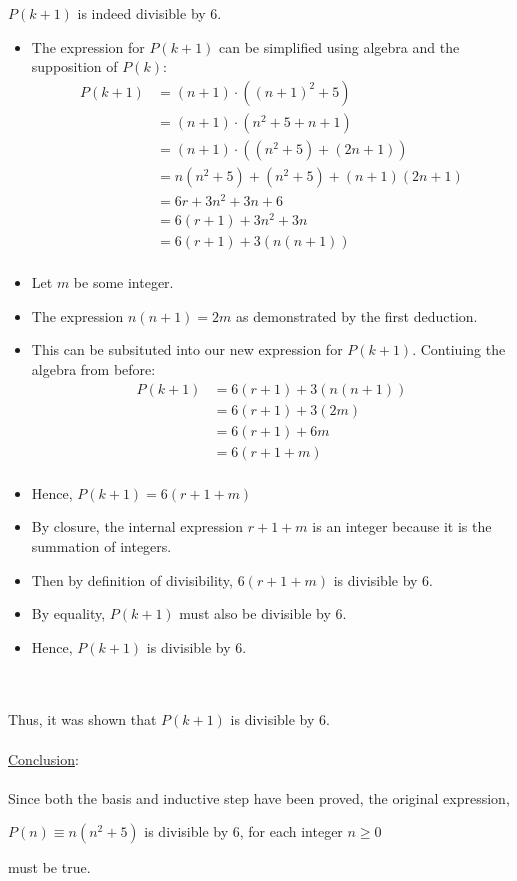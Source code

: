 \documentclass[12pt]{article}
\newcommand{\xlist}[1]{
    \begin{itemize}
        \renewcommand{\labelitemi}{$\centerdot$}
        #1
    \end{itemize}
    \newblock
    \\ \\
}
\newcommand{\xconclusion}[1]{
    \underline{Conclusion}:
    \\ \\
    #1
    \\ \\
}
\begin{document}
$P(k+1)$ is indeed divisible by 6.
\xlist{
  \item The expression for $P(k+1)$ can be simplified using algebra and the supposition of $P(k)$:
  \begin{align*}
    P(k+1) &= (n+1)\cdot((n+1)^2 + 5) \\
    &= (n+1)\cdot(n^2+5+n+1) \\
    &= (n+1)\cdot((n^2+5)+(2n+1)) \\
    &= n(n^2+5)+(n^2+5)+(n+1)(2n+1)\\
    &= 6r +3n^2+3n+6\\
    &= 6(r+1)+3n^2+3n\\
    &= 6(r+1)+3(n(n+1))\\
  \end{align*}
  \item Let $m$ be some integer.
  \item The expression $n(n+1) = 2m$ as demonstrated by the first deduction.
  \item This can be subsituted into our new expression for $P(k+1)$. Contiuing the algebra from before:
  \begin{align*}
    P(k+1) &= 6(r+1)+3(n(n+1))\\
    &= 6(r+1)+3(2m)\\
    &= 6(r+1)+6m\\
    &= 6(r+1+m)\\
  \end{align*}
  \item Hence, $P(k+1) = 6(r+1+m)$
  \item By closure, the internal expression $r+1+m$ is an integer because it is the summation of integers. 
  \item Then by definition of divisibility, $6(r+1+m)$ is divisible by 6.
  \item By equality, $P(k+1)$ must also be divisible by 6.
  \item Hence, $P(k+1)$ is divisible by 6.
}
Thus, it was shown that $P(k+1)$ is divisible by 6.
\\ \\
\xconclusion{
  Since both the basis and inductive step have been proved, the original expression,
  \begin{center}
    $P(n) \equiv n(n^2+5)$ is divisible by 6, for each integer $n \geq 0$
  \end{center}
  must be true.
}
\end{document}
